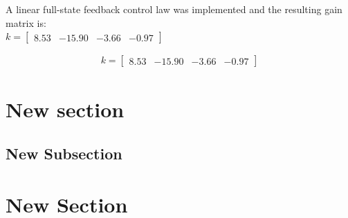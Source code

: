 \documentclass[letterpaper,10pt,oneside]{article}
\begin{document}
A linear full-state feedback control law was implemented and the resulting gain matrix is: \\

$ k =
\begin{bmatrix}
  8.53 &
  -15.90 &
  -3.66 &
  -0.97
\end{bmatrix}$

\begin{align}
  k = \left[\begin{array}{cccc}
  8.53 &
  -15.90 &
  -3.66 &
  -0.97
  \end{array}\right]
\end{align}


\section{New section}
\subsection{New Subsection}

\newpage


\printbibliography

\newpage
\appendix
\section{New Section}
\end{document}
